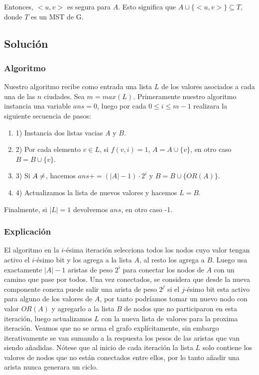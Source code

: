 \documentclass{article}
\begin{document}
Entonces, $<u,v>$ es segura para $A$. Esto significa que $A \cup \{<u, v>\} \subseteq T$, donde $T$ es un MST de G.

\subsection{Solución}

\subsubsection{Algoritmo}

Nuestro algoritmo recibe como entrada una lista $L$ de los valores asociados a cada una de las $n$ ciudades. Sea $m = max(L)$. Primeramente nuestro algoritmo instancia una variable $ans = 0$, luego por cada $0 \leq i \leq m - 1$ realizara la siguiente secuencia de pasos:

\begin{enumerate}
    \item 1) Instancia dos listas vacias $A$ y $B$.
    \item 2) Por cada elemento $v \in L$, si $f(v, i) = 1$, $A = A \cup \{v\}$, en otro caso $B = B \cup \{v\}$.
    \item 3) Si $A \ne \empty$, hacemos $ans += (|A| - 1) \cdot 2^i$ y $B = B \cup \{OR(A)\}$.
    \item 4) Actualizamos la lista de nuevos valores y hacemos $L = B$.
    
\end{enumerate}

Finalmente, si $|L| = 1$ devolvemos $ans$, en otro caso -1.

\subsubsection{Explicación}

El algoritmo en la $i$-ésima iteración selecciona todos los nodos cuyo valor tengan activo el $i$-ésimo bit y los agrega a la lista $A$, al resto los agrega a $B$. Luego usa exactamente $|A| - 1$ aristas de peso $2^i$ para conectar los nodos de $A$ con un camino que pase por todos. Una vez conectados, se considera que desde la nueva componente conexa puede salir una arista de peso $2^j$ si el $j$-ésimo bit esta activo para alguno de los valores de $A$, por tanto podríamos tomar un nuevo nodo con valor $OR(A)$ y agregarlo a la lista $B$ de nodos que no participaron en esta iteración, luego actualizamos $L$ con la nueva lista de valores para la proxima iteración. Veamos que no se arma el grafo explícitamente, sin embargo iterativamente se van sumando a la respuesta los pesos de las aristas que van siendo añadidas. Nótese que al inicio de cada iteración la lista $L$ solo contiene los valores de nodos que no están conectados entre ellos, por lo tanto añadir una arista nunca generara un ciclo.
\end{document}
